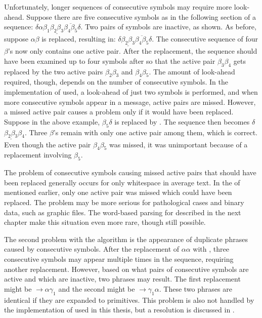 Unfortunately, longer sequences of consecutive symbols may require 
more look-ahead.  Suppose there are five consecutive symbols as in 
the following section of a sequence:
$\delta\alpha{\beta_1}\underline{{\beta_2}{\beta_3}}\overline{{\beta_4}{\beta_5}}{\delta}$.
Two pairs of symbols are inactive, as shown.
As before, suppose ${\alpha}{\beta}$ is replaced, resulting in:
$\delta$\tc{$\gamma$}$\underline{{\beta_2}{\beta_3}}\overline{{\beta_4}{\beta_5}}{\delta}$.
The consecutive sequence of four $\beta$'s now only contains one active pair.
After the replacement, the sequence should have been examined up to
four symbols after \tc{$\gamma$} so that the active pair ${\beta_3}$${\beta_4}$ 
gets replaced by the two active pairs ${\beta_2}$${\beta_3}$ and 
${\beta_4}$${\beta_5}$.  The amount of look-ahead required, 
though, depends on the number of consecutive symbols.  In 
the implementation of \repair used, a look-ahead of just two 
symbols is performed, and when more consecutive symbols appear 
in a message, active pairs are missed.  However, a missed active
pair causes a problem only if it would have been replaced.
Suppose in the above example, ${\beta_5}$${\delta}$ is replaced by
\tc{$\alpha$}.  The sequence then becomes
$\delta$\tc{$\gamma$}$\underline{{\beta_2}{\beta_3}}{\beta_4}$\tc{$\alpha$}.
Three $\beta$'s remain with only one active pair among them, which
is correct.  Even though the active pair ${\beta_4}$${\beta_5}$ was
missed, it was unimportant because of a replacement involving 
${\beta_5}$.

The problem of consecutive symbols causing missed active pairs that
should have been replaced generally occurs for only whitespace
in average text.
In the  of \wsja mentioned earlier, only one active pair was
missed which could have been replaced.  The problem may be more
serious for pathological cases and binary data, such as
graphic files.  The word-based parsing for \repair 
described in the next chapter make this situation even
more rare, though still possible.

\label{memo:repair:phdups}The second problem with the 
\repair algorithm is the appearance
of duplicate phrases caused by consecutive symbols.  After the
replacement of ${\alpha}{\alpha}$ with , three
consecutive symbols may appear multiple times in the sequence,
requiring another replacement.  However, based on what pairs of
consecutive symbols are active and which are inactive, two
phrases may result.  The first replacement might be 
 $\rightarrow {\alpha}{\gamma_1}$ and the second
might be  $\rightarrow {\gamma_1}{\alpha}$.
These two phrases are identical if they are expanded
to primitives.  This problem is also not handled by the
implementation of \repair used in this thesis, but 
a resolution is discussed in .

